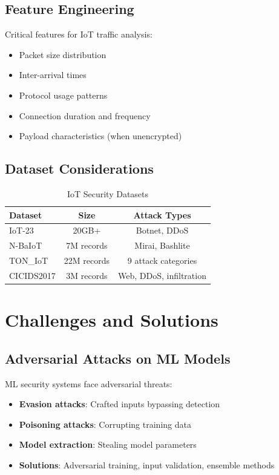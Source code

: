 \documentclass[12pt,a4paper]{article}
\begin{document}
\subsection{Feature Engineering}

Critical features for IoT traffic analysis:
\begin{itemize}
    \item Packet size distribution
    \item Inter-arrival times
    \item Protocol usage patterns
    \item Connection duration and frequency
    \item Payload characteristics (when unencrypted)
\end{itemize}

\subsection{Dataset Considerations}

\begin{table}[H]
\centering
\caption{IoT Security Datasets}
\begin{tabular}{lcc}
\toprule
\textbf{Dataset} & \textbf{Size} & \textbf{Attack Types} \\
\midrule
IoT-23 & 20GB+ & Botnet, DDoS \\
N-BaIoT & 7M records & Mirai, Bashlite \\
TON\_IoT & 22M records & 9 attack categories \\
CICIDS2017 & 3M records & Web, DDoS, infiltration \\
\bottomrule
\end{tabular}
\end{table}

\section{Challenges and Solutions}

\subsection{Adversarial Attacks on ML Models}

ML security systems face adversarial threats:
\begin{itemize}
    \item \textbf{Evasion attacks}: Crafted inputs bypassing detection
    \item \textbf{Poisoning attacks}: Corrupting training data
    \item \textbf{Model extraction}: Stealing model parameters
    \item \textbf{Solutions}: Adversarial training, input validation, ensemble methods
\end{itemize}
\end{document}
